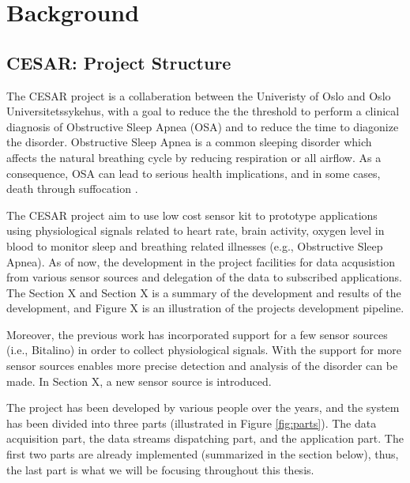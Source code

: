 \chapter{Background}

\section{CESAR: Project Structure}
The CESAR project is a collaberation between the Univeristy of Oslo and Oslo Universitetssykehus, with a goal to reduce the the threshold to perform a clinical diagnosis of Obstructive Sleep Apnea (OSA) and to reduce the time to diagonize the disorder. Obstructive Sleep Apnea is a common sleeping disorder which affects the natural breathing cycle by reducing respiration or all airflow. As a consequence, OSA can lead to serious health implications, and in some cases, death through suffocation \cite{cesarinfo}. 

The CESAR project aim to use low cost sensor kit to prototype applications using physiological signals related to heart rate, brain activity, oxygen level in blood to monitor sleep and breathing related illnesses (e.g., Obstructive Sleep Apnea). As of now, the development in the project facilities for data acqusistion from various sensor sources and delegation of the data to subscribed applications. The Section X and Section X is a summary of the development and results of the development, and Figure X is an illustration of the projects development pipeline. 

Moreover, the previous work has incorporated support for a few sensor sources (i.e., Bitalino) in order to collect physiological signals. With the support for more sensor sources enables more precise detection and analysis of the disorder can be made. In Section X, a new sensor source is introduced. 

The project has been developed by various people over the years, and the system has been divided into three parts (illustrated in Figure \ref{fig:parts}). The data acquisition part, the data streams dispatching part, and the application part. The first two parts are already implemented (summarized in the section below), thus, the last part is what we will be focusing throughout this thesis. 

